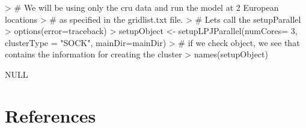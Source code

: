 \documentclass{article}
\begin{document}
\begin{Schunk}
\begin{Sinput}
> # We will be using only the cru data and run the model at 2 European locations
> # as specified in the gridlist.txt file.
> # Lets call the setupParallel
> options(error=traceback)
> setupObject <- setupLPJParallel(numCores= 3, clusterType = "SOCK", mainDir=mainDir)
> # if we check object, we see that contains the information for creating the cluster
> names(setupObject)
\end{Sinput}
\begin{Soutput}
NULL
\end{Soutput}
\end{Schunk}



\section{References}
\end{document}
